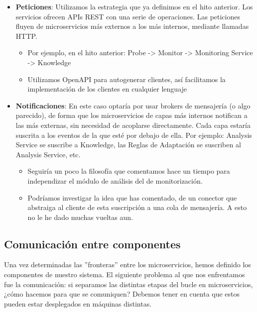 \begin{itemize}
  \item \textbf{Peticiones}: Utilizamos la estrategia que ya definimos en el hito anterior. Los servicios ofrecen APIs REST con una serie de operaciones. Las peticiones fluyen de microservicios más externos a los más internos, mediante llamadas HTTP.

  \begin{itemize}
    \item Por ejemplo, en el hito anterior: Probe -> Monitor -> Monitoring Service -> Knowledge

    \item Utilizamos OpenAPI para autogenerar clientes, así facilitamos la implementación de los clientes en cualquier lenguaje
  \end{itemize}

  \item \textbf{Notificaciones}: En este caso optaría por usar brokers de mensajería (o algo parecido), de forma que los microservicios de capas más internos notifican a las más externas, sin necesidad de acoplarse directamente. Cada capa estaría suscrita a los eventos de la que esté por debajo de ella. Por ejemplo: Analysis Service se suscribe a Knowledge, las Reglas de Adaptación se suscriben al Analysis Service, etc.

  \begin{itemize}
    \item Seguiría un poco la filosofía que comentamos hace un tiempo para independizar el módulo de análisis del de monitorización.

    \item Podríamos investigar la idea que has comentado, de un conector que abstraiga al cliente de esta suscripción a una cola de mensajería. A esto no le he dado muchas vueltas aun.
  \end{itemize}

\end{itemize}

\subsection{Comunicación entre componentes}

Una vez determinadas las ''fronteras'' entre los microservicios, hemos definido los componentes de nuestro sistema. El siguiente problema al que nos enfrentamos fue la comunicación: si separamos las distintas etapas del bucle en microservicios, ¿cómo hacemos para que se comuniquen? Debemos tener en cuenta que estos pueden estar desplegados en máquinas distintas.

